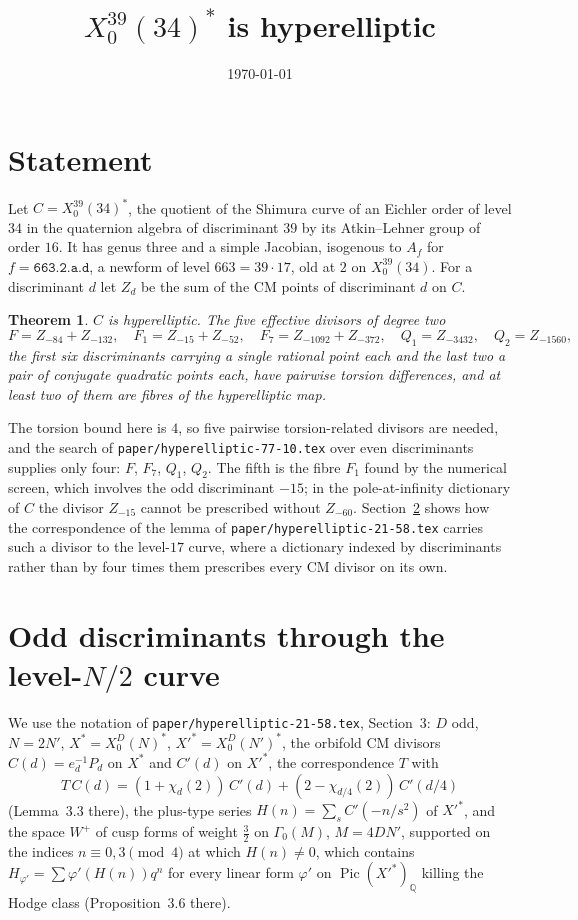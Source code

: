 \documentclass[11pt,reqno]{amsart}
\theoremstyle{plain}
\newtheorem{theorem}{Theorem}[section]
\theoremstyle{definition}
\DeclareMathOperator{\Pic}{Pic}
\newcommand{\Q}{\mathbb{Q}}
\begin{document}
\title{$X_0^{39}(34)^*$ is hyperelliptic}
\author{}
\date{\today}
\maketitle

\section{Statement}

Let $C=X_0^{39}(34)^*$, the quotient of the Shimura curve of an Eichler order of level $34$ in the
quaternion algebra of discriminant $39$ by its Atkin--Lehner group of order $16$. It has genus three
and a simple Jacobian, isogenous to $A_f$ for $f=\texttt{663.2.a.d}$, a newform of level
$663=39\cdot17$, old at $2$ on $X_0^{39}(34)$. For a discriminant $d$ let $Z_d$ be the sum of the CM
points of discriminant $d$ on $C$.

\begin{theorem}\label{thm:main}
$C$ is hyperelliptic. The five effective divisors of degree two
\[
F=Z_{-84}+Z_{-132},\quad F_1=Z_{-15}+Z_{-52},\quad F_7=Z_{-1092}+Z_{-372},\quad Q_1=Z_{-3432},\quad Q_2=Z_{-1560},
\]
the first six discriminants carrying a single rational point each and the last two a pair of
conjugate quadratic points each, have pairwise torsion differences, and at least two of them are
fibres of the hyperelliptic map.
\end{theorem}

The torsion bound here is $4$, so five pairwise torsion-related divisors are needed, and the search
of \texttt{paper/hyperelliptic-77-10.tex} over even discriminants supplies only four: $F$, $F_7$,
$Q_1$, $Q_2$. The fifth is the fibre $F_1$ found by the numerical screen, which involves the odd
discriminant $-15$; in the pole-at-infinity dictionary of $C$ the divisor $Z_{-15}$ cannot be
prescribed without $Z_{-60}$. Section~\ref{sec:odd} shows how the correspondence of the lemma of
\texttt{paper/hyperelliptic-21-58.tex} carries such a divisor to the level-$17$ curve, where a
dictionary indexed by discriminants rather than by four times them prescribes every CM divisor on
its own.

\section{Odd discriminants through the level-$N/2$ curve}\label{sec:odd}

We use the notation of \texttt{paper/hyperelliptic-21-58.tex}, Section~3: $D$ odd, $N=2N'$,
$X^*=X_0^D(N)^*$, $X'^*=X_0^D(N')^*$, the orbifold CM divisors $C(d)=e_d^{-1}P_d$ on $X^*$ and
$C'(d)$ on $X'^*$, the correspondence $T$ with
\[
T\,C(d)=(1+\chi_d(2))\,C'(d)+(2-\chi_{d/4}(2))\,C'(d/4)
\]
(Lemma~3.3 there), the plus-type series $H(n)=\sum_{s}C'(-n/s^2)$ of $X'^*$, and the space $W^+$ of
cusp forms of weight $\tfrac32$ on $\Gamma_0(M)$, $M=4DN'$, supported on the indices $n\equiv0,3\pmod4$
at which $H(n)\neq0$, which contains $H_{\varphi'}=\sum\varphi'(H(n))q^n$ for every linear form
$\varphi'$ on $\Pic(X'^*)_\Q$ killing the Hodge class (Proposition~3.6 there).
\end{document}
